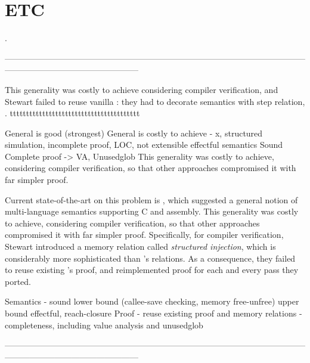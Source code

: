 {\pagebreak





\section{ETC}
.

------------------------------------------------------------------------------------------------------------------------------------------------------------





This generality was costly to achieve considering compiler verification, and Stewart \etal{} failed to reuse vanilla \cc{}: they had to decorate semantics with step relation, .
tttttttttttttttttttttttttttttttttttttttt




General is good (strongest)
General is costly to achieve - \cc{}x, structured simulation, incomplete proof, LOC, not extensible
effectful semantics
Sound
Complete proof -> VA, Unusedglob
This generality was costly to achieve, considering compiler verification, so that other approaches \cite{gu:dscal, wang:saccx} compromised it with far simpler proof.

Current state-of-the-art on this problem is , which suggested a general notion of multi-language semantics supporting C and assembly.
This generality was costly to achieve, considering compiler verification, so that other approaches \cite{gu:dscal, wang:saccx} compromised it with far simpler proof.
Specifically, for compiler verification, Stewart \etal{} introduced a memory relation called \textit{structured injection}, which is considerably more sophisticated than \cc{}'s relations.
As a consequence, they failed to reuse existing \cc{}'s proof, and reimplemented proof for each and every pass they ported.




Semantics - sound
            lower bound (callee-save checking, memory free-unfree)
            upper bound
            effectful, reach-closure
Proof - reuse existing proof and memory relations
      - completeness, including value analysis and unusedglob


------------------------------------------------------------------------------------------------------------------------------------------------------------











}
